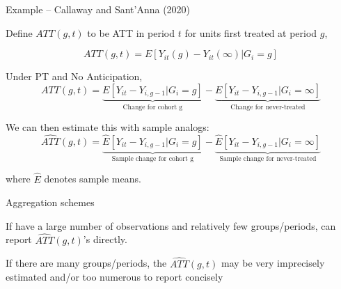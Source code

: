 \documentclass[aspectratio = 169, 13pt]{beamer}
\begin{document}
\begin{frame}{Example -- Callaway and Sant'Anna (2020)}
	\begin{wideitemize}
		\item
		Define $ATT(g,t)$ to be ATT in period $t$ for units first treated at period $g$,
		
		$$ATT(g,t) = E[ Y_{it}(g) - Y_{it}(\infty) | G_i = g] $$
		
		\pause
		\vspace{-3mm}
		\item
		Under PT and No Anticipation,
		$$ATT(g,t) = \underbrace{E[ Y_{it} - Y_{i,g-1}| G_i = g]}_{\text{Change for cohort g}} -  \underbrace{E[ Y_{it} - Y_{i,g-1}| G_i = \infty]}_{\text{Change for never-treated}} $$
		
		\pause
		\vspace{-3mm}
		\item
		We can then estimate this with sample analogs:
		$$\widehat{ATT}(g,t)= \underbrace{\widehat{E}[ Y_{it} - Y_{i,g-1} | G_i = g]}_{\text{Sample change for cohort g}} -  \underbrace{\widehat{E}[ Y_{it} - Y_{i,g-1} | G_i = \infty]}_{\text{Sample change for never-treated}} $$
		
		\vspace{-3mm}
		where $\hat{E}$ denotes sample means.
		
	\end{wideitemize}
\end{frame}

\begin{frame}{Aggregation schemes}
	\begin{wideitemize}
		\item
		If have a large number of observations and relatively few groups/periods, can report $\widehat{ATT}(g,t)$'s directly.
		
		\item
		If there are many groups/periods, the $\widehat{ATT}(g,t)$ may be very imprecisely estimated and/or too numerous to report concisely
		
	\end{wideitemize}
\end{frame}
\end{document}
